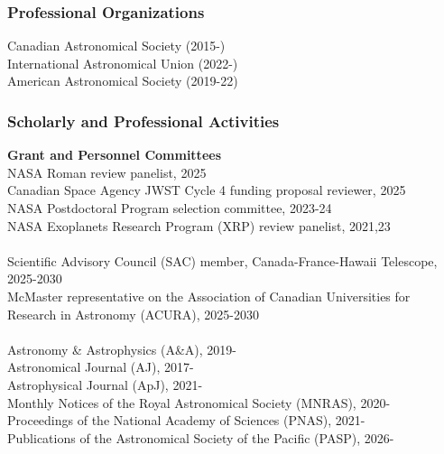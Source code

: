 \documentclass[12pt]{article}
\begin{document}
\subsubsection*{Professional Organizations}

Canadian Astronomical Society (2015-) \\
International Astronomical Union (2022-) \\
American Astronomical Society (2019-22)

\subsubsection*{Scholarly and Professional Activities}

{\bf Grant and Personnel Committees}\\
NASA Roman review panelist, 2025\\
Canadian Space Agency JWST Cycle 4 funding proposal reviewer, 2025\\  
NASA Postdoctoral Program selection committee, 2023-24\\
NASA Exoplanets Research Program (XRP) review panelist, 2021,23\\


\\
Scientific Advisory Council (SAC) member, Canada-France-Hawaii Telescope, 2025-2030\\
McMaster representative on the Association of Canadian Universities for Research in Astronomy (ACURA), 2025-2030\\




\\
Astronomy \& Astrophysics (A\&A), 2019-  \\
Astronomical Journal (AJ), 2017-  \\
Astrophysical Journal (ApJ), 2021-  \\
Monthly Notices of the Royal Astronomical Society (MNRAS), 2020-  \\
Proceedings of the National Academy of Sciences (PNAS), 2021-\\
Publications of the Astronomical Society of the Pacific (PASP), 2026-\\
\end{document}
